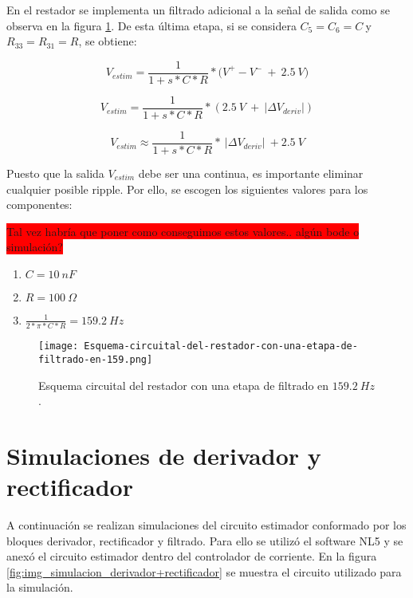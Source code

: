 En el restador se implementa un filtrado adicional a la señal de salida como se observa en la figura  \ref{fig:img_Esquema-circuital-del-restador-con-una-etapa-de-filtrado-en-159}. De esta \'{u}ltima etapa, si se considera $C_5=C_6=C\ $y $R_{33}=R_{31}=R$, se obtiene:



\begin{equation}
	V_{estim}=\frac{1}{1+s*C*R}*{(V}^+-V^-\ +\ 2.5\:V)
\end{equation}

\begin{equation} \label{eq_Vestim_1}
	V_{estim}=\frac{1}{1+s*C*R}*(2.5\: V\ +\ |\mathit{\Delta}V_{deriv}|)
\end{equation}

\begin{equation} \label{eq_Vestim_2}
	V_{estim} \approx \frac{1}{1+s*C*R}*\ |\mathit{\Delta}V_{deriv}|\ +2.5\:V
\end{equation}



Puesto que la salida $V_{estim}$ debe ser una continua, es importante eliminar cualquier posible ripple. Por ello, se escogen los siguientes valores para los componentes:

\colorbox{red}{Tal vez habría que poner como conseguimos estos valores.. algún bode o simulación?}

\begin{enumerate}
	\item  $C=10\: nF$
	
	\item  $R=100\:\Omega$
	
	\item  $\frac{1}{2*\pi *C*R}=159.2\: Hz$
\end{enumerate}

\begin{figure}[H]
	\centering
	\texttt{[image: Esquema-circuital-del-restador-con-una-etapa-de-filtrado-en-159.png]}
	\caption{Esquema circuital del restador con una etapa de filtrado en $159.2\: Hz$.}
	\label{fig:img_Esquema-circuital-del-restador-con-una-etapa-de-filtrado-en-159}
\end{figure}


\section{Simulaciones de derivador y rectificador}

A continuación se realizan simulaciones del circuito estimador conformado por los bloques derivador, rectificador y filtrado. Para ello se utilizó el software NL5 y se anexó el circuito estimador dentro del controlador de corriente. En la figura \ref{fig:img_simulacion_derivador+rectificador} se muestra el circuito utilizado para la simulación.

